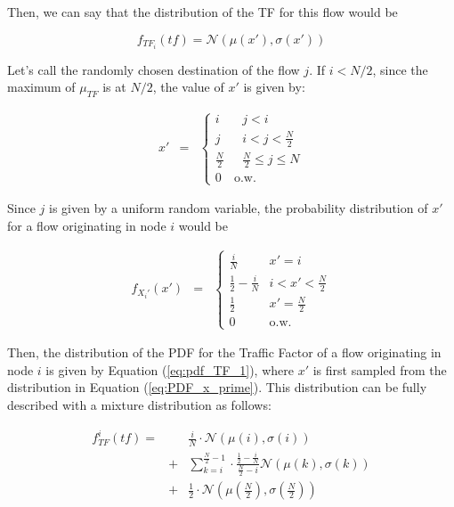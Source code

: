 Then, we can say that the distribution of the TF for this flow would be

\begin{equation}
	f_{TF_i}(tf) = \mathcal{N}(\mu(x'), \sigma(x'))
	\label{eq:pdf_TF_1}
\end{equation}

Let's call the randomly chosen destination of the flow $j$. If $i < N/2$, since the maximum of $\mu_{TF}$ is at $N/2$, the value of $x'$ is given by: 

\begin{eqnarray*}
	x' &=&
		\left\{\begin{array}{ll}
		i & \mbox{    } j < i \\
		j & \mbox{    } i < j < \frac{N}{2} \\
		\frac{N}{2} & \mbox{    } \frac{N}{2} \leq j \leq N \\ 
		0 &\mbox{o.w.}
		\end{array}\right.
\end{eqnarray*}

Since $j$ is given  by a uniform random variable, the probability distribution of $x'$ for a flow originating in node $i$ would be

\begin{eqnarray}
	f_{X_i'}(x') &=&
		\left\{\begin{array}{ll}
		\frac{i}{N} & x' = i  \\
		 \frac{1}{2} - \frac{i}{N} & i < x' < \frac{N}{2} \\
		 \frac{1}{2} & x' = \frac{N}{2} \\ 
		0 &\mbox{o.w.}
		\end{array}\right.
		\label{eq:PDF_x_prime}
\end{eqnarray}

Then, the distribution of the PDF for the Traffic Factor of a flow originating in node $i$ is given by Equation (\ref{eq:pdf_TF_1}), where $x'$ is first sampled from the distribution in Equation (\ref{eq:PDF_x_prime}).  This distribution can be fully described with a mixture distribution as follows:

\begin{eqnarray}
\nonumber
	f_{TF}^i (tf) = &&\frac{i}{N} \cdot \mathcal{N}(\mu(i),\sigma(i))  \\ \nonumber
			   &+& \sum\limits_{k=i}^{\frac{N}{2}-1} \cdot \frac{\frac{1}{2}-\frac{i}{N}}{\frac{N}{2} - i}\mathcal{N}(\mu(k),\sigma(k))  \\
			   &+& \frac{1}{2} \cdot \mathcal{N} (\mu(\frac{N}{2}),\sigma(\frac{N}{2}))
\label{eq:full_PDF_TF}
\end{eqnarray}


